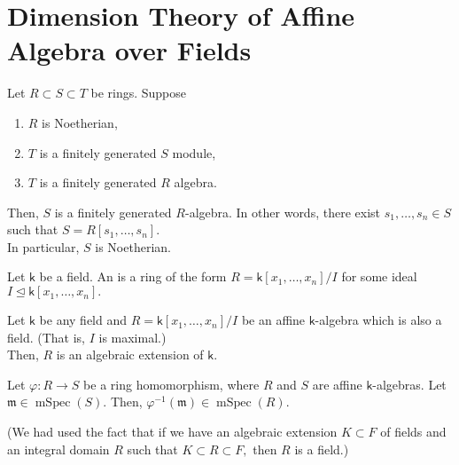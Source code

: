 \documentclass[12pt]{article}	%
\DeclareMathOperator{\mSpec}{mSpec}
\begin{document}
\section{Dimension Theory of Affine Algebra over Fields}

\begin{lem}
	Let $R \subset S \subset T$ be rings. Suppose
	\begin{enumerate}
		\item $R$ is Noetherian,
		\item $T$ is a finitely generated $S$ module,
		\item $T$ is a finitely generated $R$ algebra.
	\end{enumerate}
	\begin{center}
	\end{center}
	Then, $S$ is a finitely generated $R$-algebra. In other words, there exist $s_1, \ldots, s_n \in S$ such that $S = R[s_1, \ldots, s_n].$\\
	In particular, $S$ is Noetherian.
\end{lem}

\begin{defn}%
	Let $\mathsf{k}$ be a field. An  is a ring of the form $R = \mathsf{k}[x_1, \ldots, x_n]/I$ for some ideal $I \unlhd \mathsf{k}[x_1, \ldots, x_n].$
\end{defn}

\begin{lem}[Zariski] 
	Let $\mathsf{k}$ be any field and $R = \mathsf{k}[x_1, \ldots, x_n]/I$ be an affine $\mathsf{k}$-algebra which is also a field. \hfill{\color{ForestGreen}(That is, $I$ is maximal.)} \\
	Then, $R$ is an algebraic extension of $\mathsf{k}.$
\end{lem}

\begin{cor}
	Let $\varphi : R \to S$ be a ring homomorphism, where $R$ and $S$ are affine $\mathsf{k}$-algebras. Let $\mathfrak{m} \in \mSpec(S).$ Then, $\varphi^{-1}(\mathfrak{m}) \in \mSpec(R).$
\end{cor}
(We had used the fact that if we have an algebraic extension $K \subset F$ of fields and an integral domain $R$ such that $K \subset R \subset F,$ then $R$ is a field.)
\end{document}
